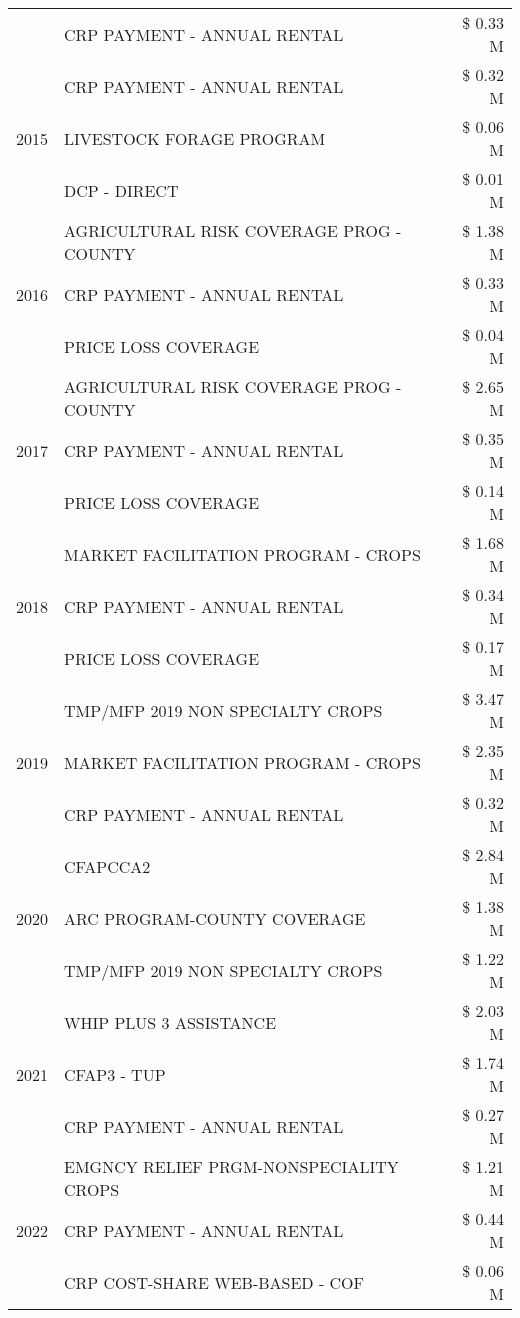 \begin{tabular}{llr}
 & CRP PAYMENT - ANNUAL RENTAL & \$ 0.33 M \\
\cline{1-3}
\multirow[t]{3}{*}{2015} & CRP PAYMENT - ANNUAL RENTAL & \$ 0.32 M \\
 & LIVESTOCK FORAGE PROGRAM & \$ 0.06 M \\
 & DCP - DIRECT & \$ 0.01 M \\
\cline{1-3}
\multirow[t]{3}{*}{2016} & AGRICULTURAL RISK COVERAGE PROG - COUNTY & \$ 1.38 M \\
 & CRP PAYMENT - ANNUAL RENTAL & \$ 0.33 M \\
 & PRICE LOSS COVERAGE & \$ 0.04 M \\
\cline{1-3}
\multirow[t]{3}{*}{2017} & AGRICULTURAL RISK COVERAGE PROG - COUNTY & \$ 2.65 M \\
 & CRP PAYMENT - ANNUAL RENTAL & \$ 0.35 M \\
 & PRICE LOSS COVERAGE & \$ 0.14 M \\
\cline{1-3}
\multirow[t]{3}{*}{2018} & MARKET FACILITATION PROGRAM - CROPS & \$ 1.68 M \\
 & CRP PAYMENT - ANNUAL RENTAL & \$ 0.34 M \\
 & PRICE LOSS COVERAGE & \$ 0.17 M \\
\cline{1-3}
\multirow[t]{3}{*}{2019} & TMP/MFP 2019 NON SPECIALTY CROPS & \$ 3.47 M \\
 & MARKET FACILITATION PROGRAM - CROPS & \$ 2.35 M \\
 & CRP PAYMENT - ANNUAL RENTAL & \$ 0.32 M \\
\cline{1-3}
\multirow[t]{3}{*}{2020} & CFAPCCA2 & \$ 2.84 M \\
 & ARC PROGRAM-COUNTY COVERAGE & \$ 1.38 M \\
 & TMP/MFP 2019 NON SPECIALTY CROPS & \$ 1.22 M \\
\cline{1-3}
\multirow[t]{3}{*}{2021} & WHIP PLUS 3 ASSISTANCE & \$ 2.03 M \\
 & CFAP3 - TUP & \$ 1.74 M \\
 & CRP PAYMENT - ANNUAL RENTAL & \$ 0.27 M \\
\cline{1-3}
\multirow[t]{3}{*}{2022} & EMGNCY RELIEF PRGM-NONSPECIALITY CROPS & \$ 1.21 M \\
 & CRP PAYMENT - ANNUAL RENTAL & \$ 0.44 M \\
 & CRP COST-SHARE WEB-BASED - COF & \$ 0.06 M \\
\cline{1-3}
\bottomrule
\end{tabular}
